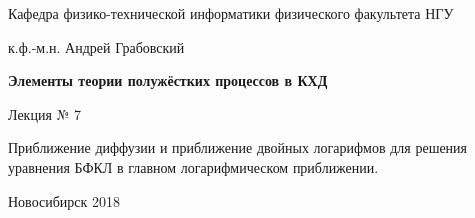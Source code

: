 \documentclass[12pt,pagesize,paper=landscape,paper=192mm:108mm]{scrbook}
\begin{document}
\begin{titlepage}
\begin{center}
    Кафедра физико-технической информатики физического факультета НГУ
    \medskip

    \Large
    к.ф.-м.н. Андрей Грабовский
    
    \bigskip

    \Large
    \textbf{Элементы теории полужёстких процессов в КХД}
    \bigskip

    \Large
    Лекция № 7
    \vfill

    \normalsize
    \begin{minipage}{0.7\linewidth}
      Приближение диффузии и приближение двойных логарифмов для
      решения уравнения БФКЛ в главном логарифмическом приближении.
    \end{minipage}
    \vfill

    \normalsize \ccbysa\hspace{0.5em}  Новосибирск 2018
  \end{center}
\end{titlepage}
\end{document}

